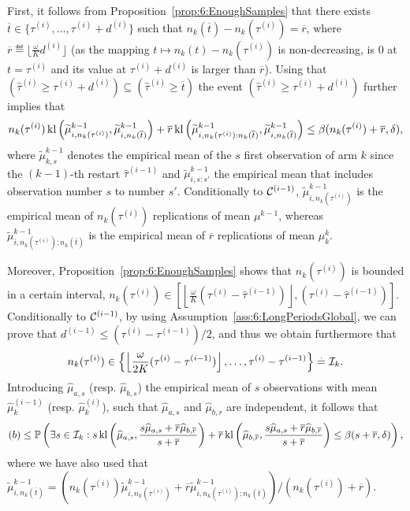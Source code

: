 First, it follows from Proposition~\ref{prop:6:EnoughSamples} that there exists $\overline{t} \in \{\tau^{(i)}, \dots, \tau^{(i)} + d^{(i)} \}$ such that
$n_k(\overline{t}) - n_k(\tau^{(i)}) = \overline{r}$, where $\overline{r} \eqdef \lfloor \frac{\omega}{K} d^{(i)}\rfloor$
(as the mapping $t \mapsto n_k(t) - n_k(\tau^{(i)})$ is non-decreasing, is $0$ at $t=\tau^{(i)}$ and its value at $\tau^{(i)}+d^{(i)}$ is larger than $\overline{r}$).
Using that $\left(\widehat{\tau}^{(i)} \geq \tau^{(i)} + d^{(i)}\right) \subseteq \left(\widehat{\tau}^{(i)} \geq \overline{t}\right)$
the event $\left(\widehat{\tau}^{(i)} \geq \tau^{(i)} + d^{(i)}\right)$ further implies that
\[
    n_k(\tau^{(i)}) \, \mathrm{kl}\left(\widetilde{\mu}^{k-1}_{i,n_k(\tau^{(i)})},\widetilde{\mu}^{k-1}_{i,n_k(\overline{t})}\right)
    + \overline{r} \, \mathrm{kl}\left(\widetilde{\mu}^{k-1}_{i,n_k(\tau^{(i)}) : n_k(\overline{t})},\widetilde{\mu}^{k-1}_{i,n_k(\overline{t})}\right) \leq \beta(n_k(\tau^{(i)}) + \overline{r},\delta),
\]
where $\widetilde{\mu}^{k-1}_{k,s}$ denotes the empirical mean of the $s$ first observation of arm $k$ since the $(k-1)$-th restart $\widehat{\tau}^{(i-1)}$ and  $\widetilde{\mu}^{k-1}_{i,s:s'}$ the empirical mean that includes observation number $s$ to number $s'$. Conditionally to $\mathcal{C}^{(i-1)}$, $\widetilde{\mu}^{k-1}_{i,n_k(\tau^{(i)})}$ is the empirical mean of $n_k(\tau^{(i)})$ \iid{} replications of mean $\mu^{k-1}$, whereas $\widetilde{\mu}^{k-1}_{i,n_k(\tau^{(i)}) : n_k(\overline{t})}$ is the empirical mean of $\overline{r}$ \iid{} replications of mean $\mu_k^{k}$.

Moreover, Proposition~\ref{prop:6:EnoughSamples} shows that $n_k(\tau^{(i)})$ is bounded in a certain interval,
$n_k(\tau^{(i)}) \in \left[\left\lfloor \frac{\omega}{K}\left(\tau^{(i)}-\widehat{\tau}^{(i-1)}\right)\right\rfloor,\left(\tau^{(i)}-\widehat{\tau}^{(i-1)}\right)\right]$.
Conditionally to $\mathcal{C}^{(i-1)}$,
by using Assumption~\ref{ass:6:LongPeriodsGlobal},
we can prove that $d^{(i-1)} \leq (\tau^{(i)} - \tau^{(i-1)})/2$,
and thus we obtain furthermore that
%
\begin{equation*}
    n_k(\tau^{(i)}) \in \left\{ \left\lfloor \frac{\omega}{2K} (\tau^{(i)}-\tau^{(i-1)} )\right\rfloor, \dots, \tau^{(i)}-\tau^{(i-1)} \right\} \overset{.}{=} \mathcal{I}_k.
\end{equation*}
%
Introducing $\widehat{\mu}_{a,s}$ (resp. $\widehat{\mu}_{b,s}$) the empirical mean of $s$ \iid{} observations with mean $\widehat{\mu}_k^{(i-1)}$ (resp. $\widehat{\mu}_k^{(i)}$), such that $\widehat{\mu}_{a,s}$ and $\widehat{\mu}_{b,r}$ are independent, it follows that
\[
    (b)  \leq \mathbb{P}\left(\exists s \in \mathcal{I}_k : s \, \mathrm{kl}\left(\widehat{\mu}_{a,s},\frac{s\widehat{\mu}_{a,s}+\overline{r}\widehat{\mu}_{b,\overline{r}}}{s+\overline{r}} \right) +  \overline{r} \, \mathrm{kl}\left(\widehat{\mu}_{b,\overline{r}},\frac{s\widehat{\mu}_{a,s}+\overline{r}\widehat{\mu}_{b,\overline{r}}}{s+\overline{r}}  \right)  \leq \beta(s+\overline{r},\delta)\right),
\]
where we have also used that $\widetilde{\mu}^{k-1}_{i,n_k(\overline{t})} = \left(n_k(\tau^{(i)})\widetilde{\mu}^{k-1}_{i,n_k(\tau^{(i)})} + \overline{r}\widetilde{\mu}^{k-1}_{i,n_k(\tau^{(i)}) : n_k(\overline{t})} \right) / (n_k(\tau^{(i)}) + \overline{r})$.

